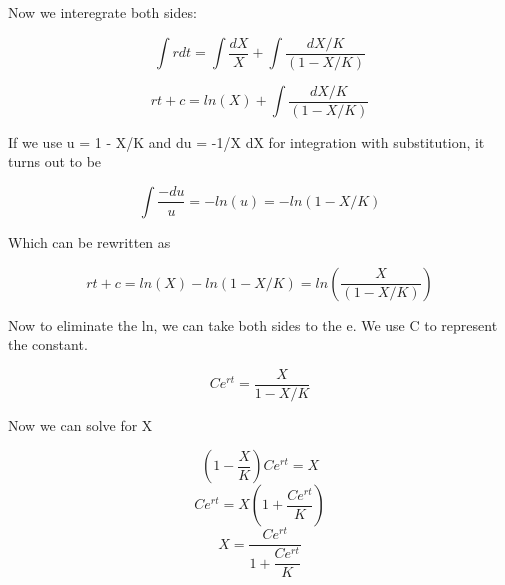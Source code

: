 \documentclass{article}
\begin{document}
Now we interegrate both sides:

\begin{equation}
    \int r dt = \int \dfrac{dX}{X} + \int \dfrac{dX/K}{(1-X/K)}
\end{equation}

\begin{equation}
    rt + c = ln(X) + \int \dfrac{dX/K}{(1-X/K)}
\end{equation}

If we use u = 1 - X/K and du = -1/X dX for integration with substitution, it turns out to be

\begin{equation}
    \int \dfrac{-du}{u} = -ln(u) = -ln(1-X/K)    
\end{equation}

Which can be rewritten as

\begin{equation}
    rt + c = ln(X) - ln(1-X/K) = ln(\dfrac{X}{(1-X/K)})
\end{equation}

Now to eliminate the ln, we can take both sides to the e. We use C to represent the constant.

\begin{equation}
    Ce^{rt} = \dfrac{X}{1-X/K}
\end{equation}

Now we can solve for X

\begin{equation}
    (1-\dfrac{X}{K})Ce^{rt} = X
\end{equation}
\begin{equation}
    Ce^{rt} = X(1+\dfrac{Ce^{rt}}{K})
\end{equation}
\begin{equation}
    X = \dfrac{Ce^{rt}}{1+\dfrac{Ce^{rt}}{K}} 
\end{equation}
\end{document}
